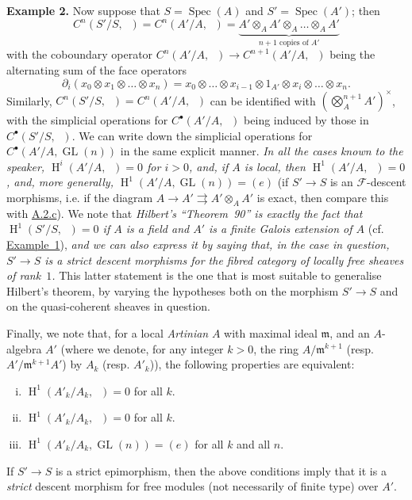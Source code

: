 \documentclass{article}
\newenvironment{rmenv}[1]
  {\phantomsection\par\medskip\noindent\textbf{#1.}\rmfamily}
  {\medskip}
\renewcommand{\cal}[1]{{\mathcal{#1}}}
\newcommand{\fk}[1]{{\mathfrak{#1}}}
\DeclareMathOperator{\HH}{H}
\DeclareMathOperator{\GL}{GL}
\DeclareMathOperator{\Ga}{G_a}
\DeclareMathOperator{\Gm}{G_m}
\DeclareMathOperator{\Spec}{Spec}
\newcommand{\oldpage}[1]{\marginpar{\footnotesize$\Big\vert$ \textit{p.~#1}}}
\begin{document}
\begin{rmenv}{Example 2}
  Now suppose that $S=\Spec(A)$ and $S'=\Spec(A')$;
  then
  \[
    C^n(S'/S,\Ga)
    = C^n(A'/A,\Ga)
    = \underbrace{A'\otimes_A A'\otimes_A\ldots\otimes_A A'}_{\mbox{$n+1$ copies of $A'$}}
  \]
  with the coboundary operator $C^n(A'/A,\Ga)\to C^{n+1}(A'/A,\Ga)$ being the alternating sum of the face operators
  \[
    \partial_i(x_0\otimes x_1\otimes\ldots\otimes x_n)
    = x_0\otimes\ldots\otimes x_{i-1}\otimes1_{A'}\otimes x_i\otimes\ldots\otimes x_n.
  \]
  Similarly, $C^n(S'/S,\Gm)=C^n(A'/A,\Gm)$ can be identified with $(\bigotimes_A^{n+1}A')^\times$, with the simplicial operations for $C^\bullet(A'/A,\Gm)$ being induced by those in $C^\bullet(S'/S,\Ga)$.
  We can write down the simplicial operations for $C^\bullet(A'/A,\GL(n))$ in the same explicit manner.
  \emph{In all the cases known to the speaker, $\HH^i(A'/A,\Ga)=0$ for $i>0$, and, if $A$ is local, then $\HH^1(A'/A,\Gm)=0$, and, more generally, $\HH^1(A'/A,\GL(n))=(e)$} (if $S'\to S$ is an $\cal{F}$-descent morphisms, i.e. if the diagram $A\to A'\rightrightarrows A'\otimes_A A'$ is exact, then compare this with \hyperref[A.2.c]{A.2.c}).
  We note that \emph{Hilbert's ``Theorem~90'' is exactly the fact that}
\oldpage{190-16}
  \emph{$\HH^1(S'/S,\Gm)=0$ if $A$ is a field and $A'$ is a finite Galois extension of $A$} (cf. \hyperref[example:A.4.d]{Example~1}), \emph{and we can also express it by saying that, in the case in question, $S'\to S$ is a strict descent morphisms for the fibred category of locally free sheaves of rank~$1$.}
  This latter statement is the one that is most suitable to generalise Hilbert's theorem, by varying the hypotheses both on the morphism $S'\to S$ and on the quasi-coherent sheaves in question.

  Finally, we note that, for a local \emph{Artinian} $A$ with maximal ideal $\fk{m}$, and an $A$-algebra $A'$ (where we denote, for any integer $k>0$, the ring $A/\fk{m}^{k+1}$ (resp. $A'/\fk{m}^{k+1}A'$) by $A_k$ (resp. $A'_k$)), the following properties are equivalent:
  \begin{enumerate}[(i)]
    \item $\HH^1(A'_k/A_k,\Ga)=0$ for all $k$.
    \item $\HH^1(A'_k/A_k,\Gm)=0$ for all $k$.
    \item $\HH^1(A'_k/A_k,\GL(n))=(e)$ for all $k$ and all $n$.
  \end{enumerate}

  If $S'\to S$ is a strict epimorphism, then the above conditions imply that it is a \emph{strict} descent morphism for free modules (not necessarily of finite type) over $A'$.
\end{rmenv}
\end{document}
